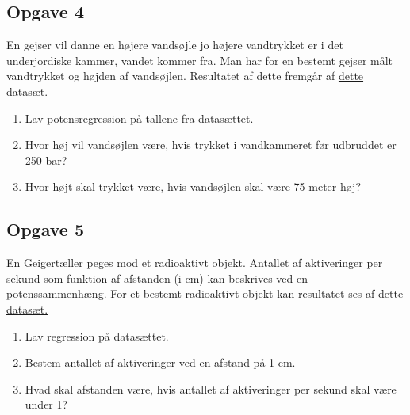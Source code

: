 \subsection*{Opgave 4}

En gejser vil danne en højere vandsøjle jo højere vandtrykket er i det underjordiske kammer, vandet kommer fra. Man har for en bestemt gejser målt vandtrykket og højden af vandsøjlen. Resultatet af dette fremgår af \href{https://github.com/ChristianJLex/TeachingNotes/raw/master/2023-2024/Data og lign/Gejser.xlsx}{\color{blue!60} dette datasæt}.

\begin{enumerate}[label=\roman*)]
	\item Lav potensregression på tallene fra datasættet.
	\item Hvor høj vil vandsøjlen være, hvis trykket i vandkammeret før udbruddet er 250 bar?
	\item Hvor højt skal trykket være, hvis vandsøjlen skal være 75 meter høj?
\end{enumerate}

\subsection*{Opgave 5}

En Geigertæller peges mod et radioaktivt objekt. Antallet af aktiveringer per sekund som funktion af afstanden (i cm) kan beskrives ved en potenssammenhæng. For et bestemt radioaktivt objekt kan resultatet ses af \href{https://github.com/ChristianJLex/TeachingNotes/raw/master/2023-2024/Data%20og%20lign/Geiger.xlsx}{\color{blue!60} dette datasæt.}

\begin{enumerate}[label=\roman*)]
	\item Lav regression på datasættet.
	\item Bestem antallet af aktiveringer ved en afstand på 1 cm. 
	\item Hvad skal afstanden være, hvis antallet af aktiveringer per sekund skal være under 1?
\end{enumerate}